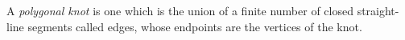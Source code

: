 A \textit{polygonal knot} is one which is the union of a finite number of closed straight-line segments called edges, whose endpoints are the vertices of the knot.
